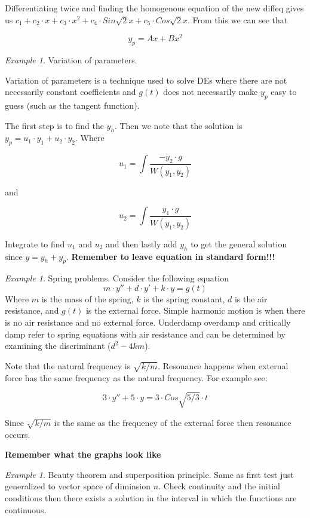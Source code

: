 \documentclass[10pt]{article}
\theoremstyle{definition}
\theoremstyle{remark}
\newtheorem{Ex}[Thm]{Example}
\theoremstyle{definition}
\begin{document}
Differentiating twice and finding the homogenous equation of the new diffeq gives us $c_1+c_2\cdot x + c_3\cdot x^2+ c_4\cdot Sin\sqrt{2}x+c_5\cdot Cos\sqrt{2}x$. From this we can see that

$$
y_p=Ax+Bx^2
$$

\begin{Ex}
Variation of parameters. 
\end{Ex}
Variation of parameters is a technique used to solve DEs where there are not necessarily constant coefficients and $g(t)$ does not necessarily make $y_p$ easy to guess (such as the tangent function). 

The first step is to find the $y_h$. Then we note that the solution is $y_p=u_1\cdot y_1+u_2\cdot y_2$. Where 

$$
u_1=\int \dfrac{-y_2\cdot g}{W(y_1,y_2)}
$$

and

$$
u_2=\int \dfrac{y_1\cdot g}{W(y_1,y_2)}
$$

Integrate to find $u_1$ and $u_2$ and then lastly add $y_h$ to get the general solution since $y=y_h+y_p$. \textbf{Remember to leave equation in standard form!!!}

\begin{Ex}
Spring problems. Consider the following equation
$$
m\cdot y''+d\cdot y'+k\cdot y= g(t)
$$
Where $m$ is the mass of the spring, $k$ is the spring constant, $d$ is the air resistance, and $g(t)$ is the external force. Simple harmonic motion is when there is no air resistance and no external force. Underdamp overdamp and critically damp refer to spring equations with air resistance and can be determined by examining the discriminant ($d^2-4km$). 

Note that the natural frequency is $\sqrt{k/m}$. Resonance happens when external force has the same frequency as the natural frequency. For example see:

$$
3\cdot y''+5\cdot y=3\cdot Cos \sqrt{5/3}\cdot t 
$$

Since $\sqrt{k/m}$ is the same as the frequency of the external force then resonance occurs. 

\textbf{Remember what the graphs look like}

\end{Ex}

\begin{Ex}
Beauty theorem and superposition principle. Same as first test just generalized to vector space of diminsion $n$. Check continuity and the initial conditions then there exists a solution in the interval in which the functions are continuous. 
\end{Ex}
\end{document}
